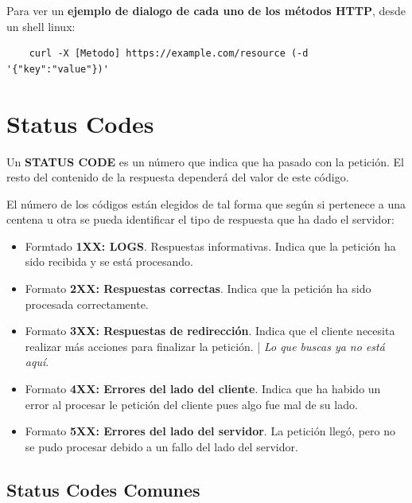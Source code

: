\documentclass[a4paper,10pt]{article}
\begin{document}
Para ver un \textbf{ejemplo de dialogo de cada uno de los métodos HTTP}, desde un shell linux:
\begin{lstlisting}
    curl -X [Metodo] https://example.com/resource (-d '{"key":"value"})'
\end{lstlisting}



\section{Status Codes}
Un \textbf{STATUS CODE} es un número que indica que ha pasado con la petición. 
El resto del contenido de la respuesta dependerá del valor de este código.
\

El número de los códigos están elegidos de tal forma que según si pertenece a una centena u otra se pueda identificar 
el tipo de respuesta que ha dado el servidor:

\begin{itemize}
    \item Formtado \textbf{1XX: LOGS}. Respuestas informativas. Indica que la petición ha sido recibida y se está procesando.
    \item Formato \textbf{2XX: Respuestas correctas}. Indica que la petición ha sido procesada correctamente.
    \item Formato \textbf{3XX: Respuestas de redirección}. Indica que el cliente necesita realizar más acciones para finalizar la petición. 
    |   \textit{Lo que buscas ya no está aquí}.
    \item Formato \textbf{4XX: Errores del lado del cliente}. Indica que ha habido un error al procesar le petición del cliente pues algo fue mal de su lado.
    \item Formato \textbf{5XX: Errores del lado del servidor}. La petición llegó, pero no se pudo procesar debido a un fallo del lado del servidor. 
\end{itemize}

\subsection{Status Codes Comunes}
\end{document}
